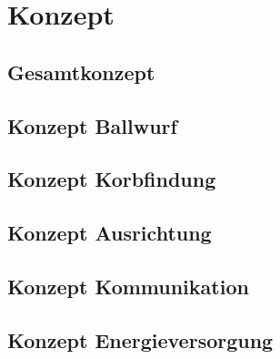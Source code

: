 \section{Konzept}

\subsection{Gesamtkonzept}

\subsection{Konzept Ballwurf}

\subsection{Konzept Korbfindung}

\subsection{Konzept Ausrichtung}

\subsection{Konzept Kommunikation}

\subsection{Konzept Energieversorgung}

